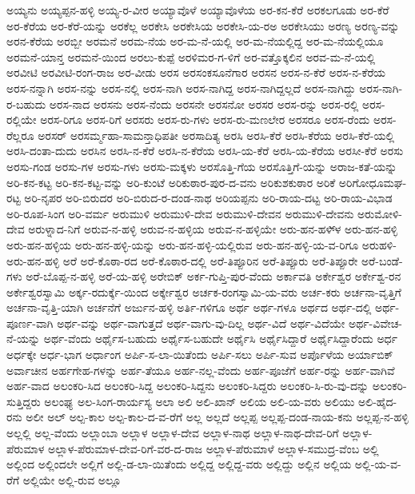 {ಅಯ್ಯನು
ಅಯ್ಯಪ್ಪನ-ಹಳ್ಳಿ
ಅಯ್ಯ-ರ-ವೀರ
ಅಯ್ಯಾವೊಳೆ
ಅಯ್ಯಾವೊಳೆಯ
ಅರ-ಕನ-ಕೆರೆ
ಅರಕಲಗೂಡು
ಅರ-ಕೆರೆ
ಅರ-ಕೆರೆಯ
ಅರ-ಕೆರೆ-ಯನ್ನು
ಅರಕೆಲ್ಲ
ಅರಕೇಸಿ
ಅರಕೇಸಿಯ
ಅರಕೇಸಿ-ಯ-ರಅ
ಅರಕೇಸಿಯು
ಅರಣ್ಯ
ಅರಣ್ಯ-ವನ್ನು
ಅರನ-ಕೆರೆಯ
ಅರಬ್ಬೀ
ಅರಮನೆ
ಅರಮ-ನೆಯ
ಅರ-ಮ-ನೆ-ಯಲ್ಲಿ
ಅರ-ಮ-ನೆಯಲ್ಲಿದ್ದ
ಅರ-ಮ-ನೆಯಲ್ಲಿಯೂ
ಅರಮನೆ-ಯಾನ್ತ
ಅರಮನೆ-ಯಿಂದ
ಅರಲು-ಕುಪ್ಪೆ
ಅರಳಿಮರ-ಗ-ಳಿಗೆ
ಅರ-ವತ್ತೊಕ್ಕಲಿನ
ಅರವ-ಮ-ನೆ-ಯಲ್ಲಿ
ಅರವೀಟಿ
ಅರವೀಟಿ-ರಂಗ-ರಾಜ
ಅರ-ವೀಡು
ಅರಸ
ಅರಸಂಕಸೂನೆಗಾರ
ಅರಸನ
ಅರಸ-ನ-ಕೆರೆ
ಅರಸ-ನ-ಕೆರೆಯ
ಅರಸ-ನನ್ನಾಗಿ
ಅರಸ-ನನ್ನು
ಅರಸ-ನಲ್ಲಿ
ಅರಸ-ನಾಗಿ
ಅರಸ-ನಾಗಿದ್ದ
ಅರಸ-ನಾಗಿದ್ದಲ್ಲದೆ
ಅರಸ-ನಾಗಿದ್ದು
ಅರಸ-ನಾಗಿ-ರ-ಬಹುದು
ಅರಸ-ನಾದ
ಅರಸನು
ಅರಸ-ನೆಂದು
ಅರಸನೇ
ಅರಸನೋ
ಅರಸರ
ಅರಸ-ರನ್ನು
ಅರಸ-ರಲ್ಲಿ
ಅರಸ-ರಲ್ಲಿಯೇ
ಅರಸ-ರಿಗೂ
ಅರಸ-ರಿಗೆ
ಅರಸರು
ಅರಸ-ರು-ಗಳು
ಅರಸ-ರು-ಮಣಲೇರ
ಅರಸರೂ
ಅರಸ-ರೆಂದು
ಅರಸ-ರೆಲ್ಲರೂ
ಅರಸರ್
ಅರಸರ್ಮ್ಮಹಾ-ಸಾಮನ್ತಾಧಿಪತೀ
ಅರಸಾದಿತ್ಯ
ಅರಸಿ
ಅರಸಿ-ಕೆರೆ
ಅರಸಿ-ಕೆರೆಯ
ಅರಸಿ-ಕೆರೆ-ಯಲ್ಲಿ
ಅರಸಿ-ದಂತಾ-ದುದು
ಅರಸಿನ
ಅರಸಿ-ನ-ಕೆರೆ
ಅರಸಿ-ನ-ಕೆರೆಯ
ಅರಸಿ-ಯ-ಕೆರೆ
ಅರಸಿ-ಯ-ಕೆರೆಯ
ಅರಸೀ-ಕೆರೆ
ಅರಸು
ಅರಸು-ಗಂಡ
ಅರಸು-ಗಳ
ಅರಸು-ಗಳು
ಅರಸು-ಮಕ್ಕಳು
ಅರಸೊತ್ತಿ-ಗೆಯ
ಅರಸೊತ್ತಿಗೆ-ಯನ್ನು
ಅರಾಜ-ಕತೆ-ಯನ್ನು
ಅರಿ-ಕನ-ಕಟ್ಟ
ಅರಿ-ಕನ-ಕಟ್ಟ-ವನ್ನು
ಅರಿ-ಕುಂಟೆ
ಅರಿಕುಠಾರ-ಪುರ-ದ-ವನು
ಅರಿಕುಶಕುಠಾರ
ಅರಿಕೆ
ಅರಿಗೋಧೂಮಘ-ರಟ್ಟ
ಅರಿ-ನೃಪರ
ಅರಿ-ಬಿರುದರ
ಅರಿ-ಬಿರುದ-ರ-ದಂಡ-ನಾಥ
ಅರಿಯಪ್ಪನು
ಅರಿ-ರಾಯ-ದಟ್ಟ
ಅರಿ-ರಾಯ-ವಿಭಾಡ
ಅರಿ-ರೂಪ-ಸಿಂಗ
ಅರಿ-ವರ್ಮ
ಅರುಮುಳಿ
ಅರುಮುಳಿ-ದೇವ
ಅರುಮುಳಿ-ದೇವನ
ಅರುಮುಳಿ-ದೇವನು
ಅರುಮೋಳಿ-ದೇವ
ಅರುಳ್ನಾದ-ನಿಗೆ
ಅರುವ-ನ-ಹಳ್ಳಿ
ಅರುವ-ನ-ಹಳ್ಳಿಯ
ಅರುವ-ನ-ಹಳ್ಳಿಯೇ
ಅರು-ಹನ-ಹಳಿ್ಳ
ಅರು-ಹನ-ಹಳ್ಳಿ
ಅರು-ಹನ-ಹಳ್ಳಿಯ
ಅರು-ಹನ-ಹಳ್ಳಿ-ಯನ್ನು
ಅರು-ಹನ-ಹಳ್ಳಿ-ಯಲ್ಲಿರುವ
ಅರು-ಹನ-ಹಳ್ಳಿ-ಯ-ವ-ರಿಗೂ
ಅರುಹಳಿ-ಅರು-ಹನ-ಹಳ್ಳಿ
ಅರೆ
ಅರೆ-ಕೊಠಾ-ರದ
ಅರೆ-ಕೊಠಾರ-ದಲ್ಲಿ
ಅರೆ-ತಿಪ್ಪೂರಿನ
ಅರೆ-ತಿಪ್ಪೂರು
ಅರೆ-ತಿಪ್ಪೂರೇ
ಅರೆ-ಬಂಡೆ-ಗಳು
ಅರೆ-ಬೊಪ್ಪ-ನ-ಹಳ್ಳಿ
ಅರೆ-ಯ-ಹಳ್ಳಿ
ಅರೇಬಿಕ್
ಅರ್ಕ-ಗುಪ್ತಿ-ಪುರ-ವೆಂದು
ಅರ್ಕಾವತಿ
ಅರ್ಕೇಶ್ವರ
ಅರ್ಕೇಶ್ವ-ರನ
ಅರ್ಕೇಶ್ವರಸ್ವಾಮಿ
ಅರ್ಕ್ಕ-ರದುರ್ಕ್ಕೆ-ಯಿಂದ
ಅರ್ಕ್ಕೇಶ್ವರ
ಅರ್ಚಕ-ರಂಗಸ್ವಾಮಿ-ಯ-ವರು
ಅರ್ಚ-ಕರು
ಅರ್ಚನಾ-ವೃತ್ತಿಗೆ
ಅರ್ಚನಾ-ವೃತ್ತಿ-ಯಾಗಿ
ಅರ್ಚನೆಗೆ
ಅರ್ಜುನ-ಹಳ್ಳಿ
ಅರ್ತಿ-ಗಳಿಗೂ
ಅರ್ಥ
ಅರ್ಥ-ಗಳೂ
ಅರ್ಥದ
ಅರ್ಥ-ದಲ್ಲಿ
ಅರ್ಥ-ಪೂರ್ಣ-ವಾಗಿ
ಅರ್ಥ-ವನ್ನು
ಅರ್ಥ-ವಾಗುತ್ತದೆ
ಅರ್ಥ-ವಾಗು-ವು-ದಿಲ್ಲ
ಅರ್ಥ-ವಿದೆ
ಅರ್ಥ-ವಿದೆಯೇ
ಅರ್ಥ-ವಿವೇಚ-ನೆ-ಯನ್ನು
ಅರ್ಥ-ವೆಂದು
ಅರ್ಥೈಸ-ಬಹುದು
ಅರ್ಥೈಸ-ಬಹುದೇ
ಅರ್ಥೈಸಿ
ಅರ್ಥೈಸಿದ್ದಾರೆ
ಅರ್ಥೈಸಿದ್ದಾರೆಂದು
ಅರ್ಧ
ಅರ್ಧಕ್ಕೇ
ಅರ್ಧ-ಭಾಗ
ಅರ್ಧಾಂಗ
ಅರ್ಪಿ-ಸ-ಲಾ-ಯಿತೆಂದು
ಅರ್ಪಿ-ಸಲು
ಅರ್ಪಿ-ಸುವ
ಅರ್ಪೊಳೆಯ
ಅರ್ಯಾಬಿಕ್
ಅರ್ವಾಚೀನ
ಅರ್ಹಗೇಹ-ಗಳನ್ನು
ಅರ್ಹ-ತೆಯೂ
ಅರ್ಹ-ನಲ್ಲ-ವೆಂದು
ಅರ್ಹ-ಪೂಜೆಗೆ
ಅರ್ಹ-ರನ್ನು
ಅರ್ಹ-ವಾಗಿವೆ
ಅರ್ಹ-ವಾದ
ಅಲಂಕರಿ-ಸಿದ
ಅಲಂಕರಿ-ಸಿದ್ದ
ಅಲಂಕರಿ-ಸಿದ್ದನು
ಅಲಂಕರಿ-ಸಿದ್ದರು
ಅಲಂಕರಿ-ಸಿ-ರು-ವು-ದನ್ನು
ಅಲಂಕರಿ-ಸುತ್ತಿದ್ದರು
ಅಲಂಘ್ಯ
ಅಲ-ಸಿಂಗ-ರಾರ್ಯಸ್ಯ
ಅಲಾ
ಅಲಿ
ಅಲಿ-ಖಾನ್
ಅಲಿಯ
ಅಲಿ-ಯ-ವರು
ಅಲಿಯು
ಅಲಿ-ಹೈದ-ರನು
ಅಲೀ
ಅಲ್
ಅಲ್ಪ-ಕಾಲ
ಅಲ್ಪ-ಕಾಲ-ದ-ವ-ರೆಗೆ
ಅಲ್ಲ
ಅಲ್ಲದೆ
ಅಲ್ಲಪ್ಪ
ಅಲ್ಲಪ್ಪ-ದಂಡ-ನಾಯ-ಕನು
ಅಲ್ಲಪ್ಪ-ನ-ಹಳ್ಳಿ
ಅಲ್ಲಲ್ಲಿ
ಅಲ್ಲ-ವೆಂದು
ಅಲ್ಲಾಂಬಾ
ಅಲ್ಲಾಳ
ಅಲ್ಲಾಳ-ದೇವ
ಅಲ್ಲಾಳ-ನಾಥ
ಅಲ್ಲಾಳ-ನಾಥ-ದೇವ-ರಿಗೆ
ಅಲ್ಲಾಳ-ಪೆರುಮಾಳ
ಅಲ್ಲಾಳ-ಪೆರುಮಾಳ-ದೇವ-ರಿಗೆ-ವರ-ದ-ರಾಜ
ಅಲ್ಲಾಳ-ಪೆರುಮಾಳೆ
ಅಲ್ಲಾಳ-ಸಮುದ್ರ-ವೆಂಬ
ಅಲ್ಲಿ
ಅಲ್ಲಿಂದ
ಅಲ್ಲಿಂದಲೇ
ಅಲ್ಲಿಗೆ
ಅಲ್ಲಿ-ಡ-ಲಾ-ಯಿತೆಂದು
ಅಲ್ಲಿದ್ದ
ಅಲ್ಲಿದ್ದ-ವರು
ಅಲ್ಲಿದ್ದು
ಅಲ್ಲಿನ
ಅಲ್ಲಿಯ
ಅಲ್ಲಿ-ಯ-ವ-ರೆಗೆ
ಅಲ್ಲಿಯೇ
ಅಲ್ಲಿ-ರುವ
ಅಲ್ಲೂ
}
